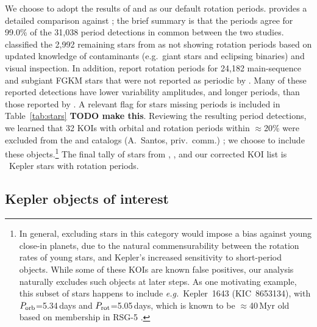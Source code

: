 \documentclass[11pt,twocolumn,tighten]{aastex63}
\begin{document}
We choose to adopt the results of  and
 as our default rotation periods.
 provides a detailed comparison against
; the brief summary is that the periods
agree for 99.0\% of the 31{,}038 period detections in common between
the two studies.   classified the 2{,}992
remaining stars from  as not showing
rotation periods based on updated knowledge of contaminants
(e.g.~giant stars and eclipsing binaries) and visual inspection.
In addition,
 report rotation periods for 24{,}182
main-sequence and subgiant FGKM stars that were not reported as
periodic by .  Many of
these reported detections have lower variability amplitudes, and
longer periods, than those reported by
.  A relevant flag for stars
missing  periods is included in
Table~\ref{tab:stars} {\bf TODO make this}.  Reviewing the resulting period detections, we
learned that 32 KOIs with orbital and rotation periods within
$\approx$20\% were excluded from the  and
 catalogs (A.~Santos, priv.~comm.) ; we choose
to include these objects.\footnote{In general, excluding stars in this
category would impose a bias against young close-in planets, due to
the natural commensurability between the rotation rates of young
stars, and Kepler's increased sensitivity to short-period objects.
While some of these KOIs are known false positives, our analysis
naturally excludes such objects at later steps.  As one motivating
example, this subset of stars happens to include {\it
e.g.}~Kepler~1643 (KIC~8653134), with $P_{\rm orb}$=5.34\,days and
$P_{\rm rot}$=5.05\,days, which is known to be $\approx$40\,Myr old
based on membership in RSG-5 \citep{Bouma_2022b}.  }
The final tally of stars from ,
, and our corrected KOI list is
\nuniqstarsantosrot\ Kepler stars with rotation periods.





\subsection{Kepler objects of interest}
\label{subsec:planetsel}
\end{document}
